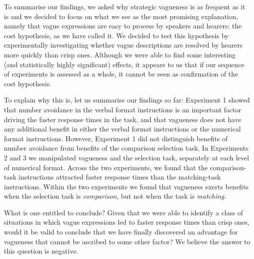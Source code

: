 To summarise our findings, we asked why strategic vagueness is as frequent as it is and we decided to focus on what we see as the most promising explanation, namely that vague expressions are easy to process by speakers and hearers: the cost hypothesis, as we have called it. We decided to test this hypothesis by experimentally investigating whether vague descriptions are resolved by hearers more quickly than crisp ones. Although we were able to find some interesting (and statistically highly significant) effects, it appears to us that if our sequence of experiments is assessed as a whole, it cannot be seen as confirmation of the cost hypothesis.

To explain why this is, let us summarise our findings so far: %
%
Experiment 1 showed that number avoidance in the verbal format instructions is an important factor driving the faster response times in the task, and that vagueness does not have any additional benefit in either the verbal format instructions or the numerical format instructions. However, Experiment 1 did not distinguish benefits of number avoidance from benefits of the comparison selection task. In Experiments 2 and 3 we manipulated vagueness and the selection task, separately at each level of numerical format. Across the two experiments, we found that the comparison-task instructions attracted faster response times than the matching-task instructions. Within the two experiments we found that vagueness exerts benefits when the selection task is \emph{comparison}, but not when the task is \emph{matching}.

What is one entitled to conclude? Given that we were able to identify a class of situations in which vague expressions led to faster response times than crisp ones, would it be valid to conclude that we have finally discovered an advantage for vagueness that cannot be ascribed to some other factor? We believe the answer to this question is negative.


